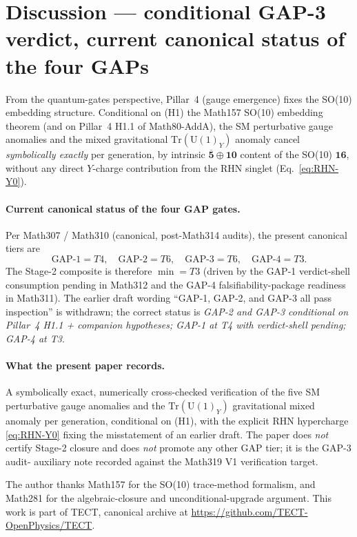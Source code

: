 \section{Discussion --- conditional GAP-3 verdict, current canonical
status of the four GAPs}\label{sec:discussion}

From the quantum-gates perspective, Pillar~4 (gauge emergence)
fixes the SO(10) embedding structure. Conditional on (H1) the
Math157 SO(10) embedding theorem (and on Pillar~4 H1.1 of
Math80-AddA), the SM perturbative gauge anomalies and the mixed
gravitational $\mathrm{Tr}(\mathrm{U}(1)_Y)$ anomaly cancel
\emph{symbolically exactly} per generation, by intrinsic
$\overline{\mathbf{5}}\oplus\mathbf{10}$ content of the SO(10)
$\mathbf{16}$, without any direct $Y$-charge contribution from the
RHN singlet (Eq.~\eqref{eq:RHN-Y0}).

\paragraph{Current canonical status of the four GAP gates.}
Per Math307 / Math310 (canonical, post-Math314 audits), the
present canonical tiers are
\[
  \text{GAP-1}=T4, \quad \text{GAP-2}=T6, \quad \text{GAP-3}=T6,
  \quad \text{GAP-4}=T3.
\]
The Stage-2 composite is therefore $\min = T3$ (driven by the
GAP-1 verdict-shell consumption pending in Math312 and the GAP-4
falsifiability-package readiness in Math311). The earlier draft
wording ``GAP-1, GAP-2, and GAP-3 all pass inspection'' is
withdrawn; the correct status is \emph{GAP-2 and GAP-3 conditional
on Pillar~4 H1.1 + companion hypotheses; GAP-1 at T4 with
verdict-shell pending; GAP-4 at T3}.

\paragraph{What the present paper records.}
A symbolically exact, numerically cross-checked verification of the
five SM perturbative gauge anomalies and the
$\mathrm{Tr}(\mathrm{U}(1)_Y)$ gravitational mixed anomaly per
generation, conditional on (H1), with the explicit RHN
hypercharge \eqref{eq:RHN-Y0} fixing the misstatement of an earlier
draft. The paper does \emph{not} certify Stage-2 closure and does
\emph{not} promote any other GAP tier; it is the GAP-3 audit-
auxiliary note recorded against the Math319 V1 verification target.

\begin{acknowledgments}
The author thanks Math157 for the SO(10) trace-method formalism, and
Math281 for the algebraic-closure and unconditional-upgrade argument.
This work is part of TECT, canonical archive at
\url{https://github.com/TECT-OpenPhysics/TECT}.
\end{acknowledgments}





